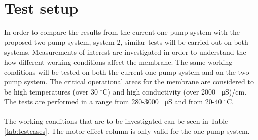 \section{Test setup}
In order to compare the results from the current one pump system with the proposed two pump system, system 2, similar tests will be carried out on both systems. Measurements of interest are investigated in order to understand the how different working conditions affect the membrane. The same working conditions will be tested on both the current one pump system and on the two pump system. The critical operational areas for the membrane are considered to be high temperatures (over 30 $^\circ$C) and high conductivity (over 2000 \SI{}{\micro\siemens})/cm. The tests are performed in a range from 280-3000 \SI{}{\micro\siemens} and from 20-40 $^\circ$C. \\
\\
The working conditions that are to be investigated can be seen in Table \ref{tab:testcases}. The motor effect column is only valid for the one pump system. 


